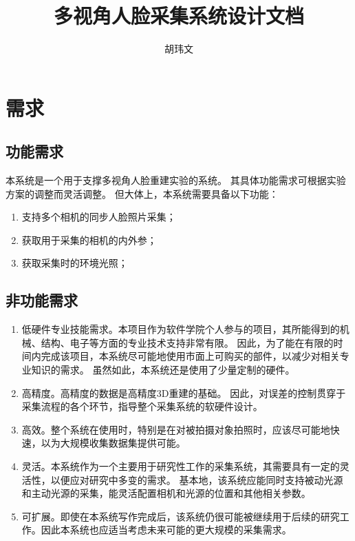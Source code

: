 \documentclass{ctexart}
\title{多视角人脸采集系统设计文档}
\author{胡玮文}
\begin{document}
\maketitle

\section{需求}

\subsection{功能需求}

本系统是一个用于支撑多视角人脸重建实验的系统。
其具体功能需求可根据实验方案的调整而灵活调整。
但大体上，本系统需要具备以下功能：
\begin{enumerate}
    \item 支持多个相机的同步人脸照片采集；
    \item 获取用于采集的相机的内外参；
    \item 获取采集时的环境光照；
\end{enumerate}

\subsection{非功能需求}

\begin{enumerate}
    \item 低硬件专业技能需求。本项目作为软件学院个人参与的项目，其所能得到的机械、结构、电子等方面的专业技术支持非常有限。
    因此，为了能在有限的时间内完成该项目，本系统尽可能地使用市面上可购买的部件，以减少对相关专业知识的需求。
    虽然如此，本系统还是使用了少量定制的硬件。

    \item 高精度。高精度的数据是高精度3D重建的基础。
    因此，对误差的控制贯穿于采集流程的各个环节，指导整个采集系统的软硬件设计。

    \item 高效。整个系统在使用时，特别是在对被拍摄对象拍照时，应该尽可能地快速，以为大规模收集数据集提供可能。

    \item 灵活。本系统作为一个主要用于研究性工作的采集系统，其需要具有一定的灵活性，以便应对研究中多变的需求。
    基本地，该系统应能同时支持被动光源和主动光源的采集，能灵活配置相机和光源的位置和其他相关参数。

    \item 可扩展。即使在本系统写作完成后，该系统仍很可能被继续用于后续的研究工作。因此本系统也应适当考虑未来可能的更大规模的采集需求。

\end{enumerate}
\end{document}
